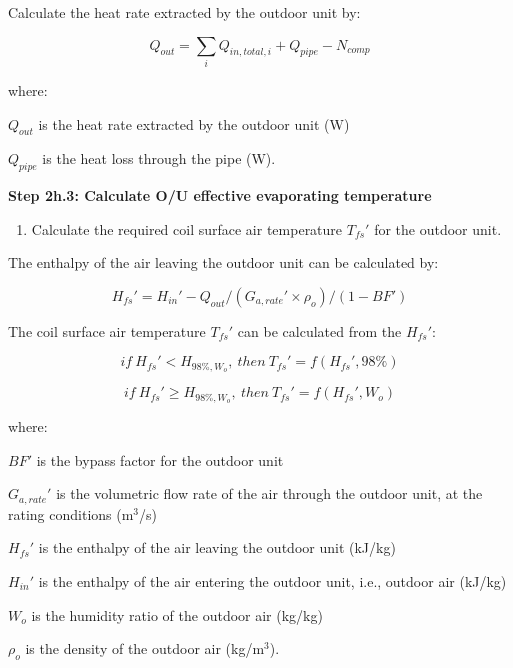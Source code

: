 Calculate the heat rate extracted by the outdoor unit by:

\begin{equation}
Q_{out} = \sum_iQ_{in,total,i}+Q_{pipe}-N_{comp}
\end{equation}

where:

\(Q_{out}\) is the heat rate extracted by the outdoor unit (W)

\(Q_{pipe}\) is the heat loss through the pipe (W).

\textbf{Step 2h.3: Calculate O/U effective evaporating temperature}

\begin{enumerate}
\def\labelenumi{(\arabic{enumi})}
\tightlist
\item
  Calculate the required coil surface air temperature \({T_{fs}}'\) for the outdoor unit.
\end{enumerate}

The enthalpy of the air leaving the outdoor unit can be calculated by:

\begin{equation}
{H_{fs}}' = {H_{in}}'-Q_{out}/({G_{a,rate}}'\times{\rho_o})/(1-BF')
\end{equation}

The coil surface air temperature \({T_{fs}}'\) can be calculated from the \({H_{fs}}'\):

\begin{equation}
if~{H_{fs}}'<H_{98\%,W_o}{,~then~}{T_{fs}}' = f({H_{fs}}',98\%)
\end{equation}

\begin{equation}
if~{H_{fs}}'\ge{H_{98\%,W_o}}{,~then~}{T_{fs}}' = f({H_{fs}}',W_o)
\end{equation}

where:

\(BF'\) is the bypass factor for the outdoor unit

\({G_{a,rate}}'\) is the volumetric flow rate of the air through the outdoor unit, at the rating conditions (m\(^{3}\)/s)

\({H_{fs}}'\) is the enthalpy of the air leaving the outdoor unit (kJ/kg)

\({H_{in}}'\) is the enthalpy of the air entering the outdoor unit, i.e., outdoor air (kJ/kg)

\(W_o\) is the humidity ratio of the outdoor air (kg/kg)

\(\rho_o\) is the density of the outdoor air (kg/m\(^{3}\)).

